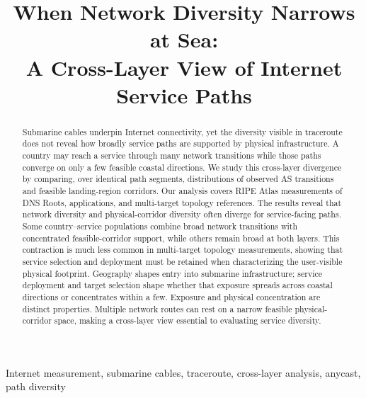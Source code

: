 \documentclass[10pt,conference,letterpaper]{IEEEtran}
\begin{document}
\title{When Network Diversity Narrows at Sea:\\
A Cross-Layer View of Internet Service Paths}

\author{}

\maketitle

\begin{abstract}
Submarine cables underpin Internet connectivity, yet the diversity
visible in traceroute does not reveal how broadly service paths are supported
by physical infrastructure. A country may reach a service through many network
transitions while those paths converge on only a few feasible coastal
directions. We study this cross-layer divergence by comparing, over identical
path segments, distributions of observed AS transitions and feasible
landing-region corridors. Our analysis covers RIPE Atlas measurements of DNS
Roots, applications, and multi-target topology references. The results reveal
that network diversity and
physical-corridor diversity often diverge for service-facing paths. Some
country--service populations combine broad network transitions with
concentrated feasible-corridor support, while others remain broad at both
layers. This contraction is much less common in multi-target topology
measurements, showing that service selection and deployment must be retained
when characterizing the user-visible physical footprint. Geography shapes
entry into submarine infrastructure; service deployment and target selection
shape whether that exposure spreads across coastal directions or concentrates
within a few. Exposure and physical concentration are distinct properties.
Multiple network routes can rest on a narrow feasible
physical-corridor space, making a cross-layer view essential to evaluating
service diversity.
\end{abstract}

\begin{IEEEkeywords}
Internet measurement, submarine cables, traceroute, cross-layer analysis,
anycast, path diversity
\end{IEEEkeywords}












\end{document}
